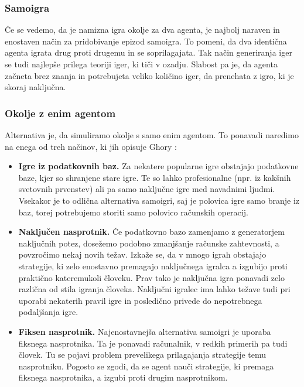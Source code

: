 \documentclass[12pt,a4paper]{amsart}
\theoremstyle{definition} %
\theoremstyle{plain} %
\begin{document}
\subsubsection{Samoigra}
Če se vedemo, da je namizna igra okolje za dva agenta, je najbolj naraven in enostaven način za 
pridobivanje epizod samoigra. To pomeni, da dva identična agenta igrata drug proti drugemu in se 
soprilagajata. Tak način generiranja iger se tudi najlepše prilega teoriji iger, ki tiči v ozadju. 
Slabost pa je, da agenta začneta brez znanja in potrebujeta veliko količino iger, da prenehata z 
igro, ki je skoraj naključna.

\subsubsection{Okolje z enim agentom}
Alternativa je, da simuliramo okolje s samo enim agentom. To ponavadi naredimo na enega od treh 
načinov, ki jih opisuje Ghory \cite{RLboard}:
\begin{itemize}
    \item \textbf{Igre iz podatkovnih baz.} Za nekatere popularne igre obstajajo podatkovne baze, 
            kjer so shranjene stare igre. Te so lahko profesionalne (npr. iz kakšnih svetovnih
            prvenstev) ali pa samo naključne igre med navadnimi ljudmi. Vsekakor je to odlična 
            alternativa samoigri, saj je polovica igre samo branje iz baz, torej potrebujemo storiti 
            samo polovico računskih operacij.
    \item \textbf{Naključen nasprotnik.} Če podatkovno bazo zamenjamo z generatorjem naključnih potez, 
            dosežemo podobno zmanjšanje računske zahtevnosti, a povzročimo nekaj novih težav. Izkaže 
            se, da v mnogo igrah obstajajo strategije, ki zelo enostavno premagajo naključnega igralca 
            a izgubijo proti praktično kateremukoli človeku. Prav tako je naključna igra ponavadi zelo 
            različna od stila igranja človeka. Naključni igralec ima lahko težave tudi pri uporabi 
            nekaterih pravil igre in posledično privede do nepotrebnega podaljšanja igre.
    \item \textbf{Fiksen nasprotnik.} Najenostavnejša alternativa samoigri je uporaba fiksnega 
            nasprotnika. Ta je ponavadi računalnik, v redkih primerih pa tudi človek. Tu se pojavi 
            problem prevelikega prilagajanja strategije temu nasprotniku. Pogosto se zgodi, da se 
            agent nauči strategije, ki premaga fiksnega nasprotnika, a izgubi proti drugim 
            nasprotnikom.
\end{itemize}
\end{document}
